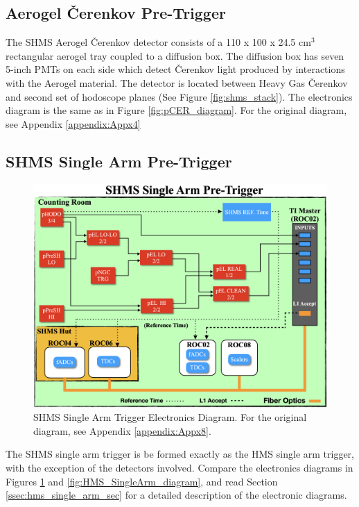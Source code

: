 \documentclass[11pt]{article}
\begin{document}
\subsection{Aerogel \v{C}erenkov Pre-Trigger}
\indent The SHMS Aerogel \v{C}erenkov detector consists of a 110 x 100 x 24.5 cm$^{3}$ rectangular aerogel tray coupled to a diffusion box. The diffusion box has seven 5-inch PMTs on each side
which detect \v{C}erenkov light produced by interactions with the Aerogel material\cite{shms_aero_article}. The detector is located between Heavy Gas \v{C}erenkov and second set of hodoscope planes
(See Figure \ref{fig:shms_stack}). The electronics diagram is the same as in Figure \ref{fig:pCER_diagram}. For the original diagram, see Appendix \ref{appendix:Appx4}
\newpage
\subsection{SHMS Single Arm Pre-Trigger}
\begin{figure}[h!]
  \centering
  \includegraphics[scale=0.35]{SHMS_SingleArm_diagram.png}
  \caption{SHMS Single Arm Trigger Electronics Diagram. For the original diagram, see Appendix \ref{appendix:Appx8}.}
  \label{fig:SHMS_SingleArm_diagram}
\end{figure}

\indent The SHMS single arm trigger is be formed exactly as the HMS single arm trigger, with the exception of the detectors involved. Compare the electronics diagrams in Figures \ref{fig:SHMS_SingleArm_diagram} and
\ref{fig:HMS_SingleArm_diagram}, and read Section \ref{ssec:hms_single_arm_sec} for a detailed description of the electronic diagrams. 
\newpage
\end{document}
